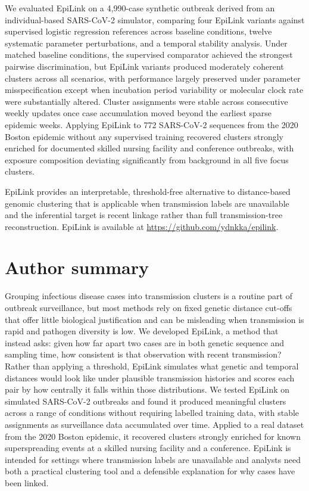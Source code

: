 \documentclass[10pt,letterpaper]{article}
\begin{document}
We evaluated EpiLink on a 4{,}990-case synthetic outbreak derived from an individual-based SARS-CoV-2 simulator, comparing four EpiLink variants against supervised logistic regression references across baseline conditions, twelve systematic parameter perturbations, and a temporal stability analysis. Under matched baseline conditions, the supervised comparator achieved the strongest pairwise discrimination, but EpiLink variants produced moderately coherent clusters across all scenarios, with performance largely preserved under parameter misspecification except when incubation period variability or molecular clock rate were substantially altered. Cluster assignments were stable across consecutive weekly updates once case accumulation moved beyond the earliest sparse epidemic weeks. Applying EpiLink to 772 SARS-CoV-2 sequences from the 2020 Boston epidemic without any supervised training recovered clusters strongly enriched for documented skilled nursing facility and conference outbreaks, with exposure composition deviating significantly from background in all five focus clusters.

EpiLink provides an interpretable, threshold-free alternative to distance-based genomic clustering that is applicable when transmission labels are unavailable and the inferential target is recent linkage rather than full transmission-tree reconstruction. EpiLink is available at \url{https://github.com/ydnkka/epilink}.

\section*{Author summary}
Grouping infectious disease cases into transmission clusters is a routine part of outbreak surveillance, but most methods rely on fixed genetic distance cut-offs that offer little biological justification and can be misleading when transmission is rapid and pathogen diversity is low. We developed EpiLink, a method that instead asks: given how far apart two cases are in both genetic sequence and sampling time, how consistent is that observation with recent transmission? Rather than applying a threshold, EpiLink simulates what genetic and temporal distances would look like under plausible transmission histories and scores each pair by how centrally it falls within those distributions. We tested EpiLink on simulated SARS-CoV-2 outbreaks and found it produced meaningful clusters across a range of conditions without requiring labelled training data, with stable assignments as surveillance data accumulated over
time. Applied to a real dataset from the 2020 Boston epidemic, it recovered clusters strongly enriched for known superspreading events at a skilled nursing facility and a conference. EpiLink is intended for settings where transmission
labels are unavailable and analysts need both a practical clustering tool and a defensible explanation for why cases have been linked.
\end{document}
